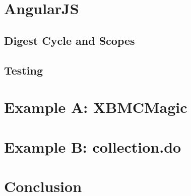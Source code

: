 

\chapter{AngularJS}


\section{Digest Cycle and Scopes}

\section{Testing}

\chapter{Example A: XBMCMagic}
\label{ch:xbmc}





\chapter{Example B: collection.do}
\label{ch:collection}






\chapter{Conclusion}

